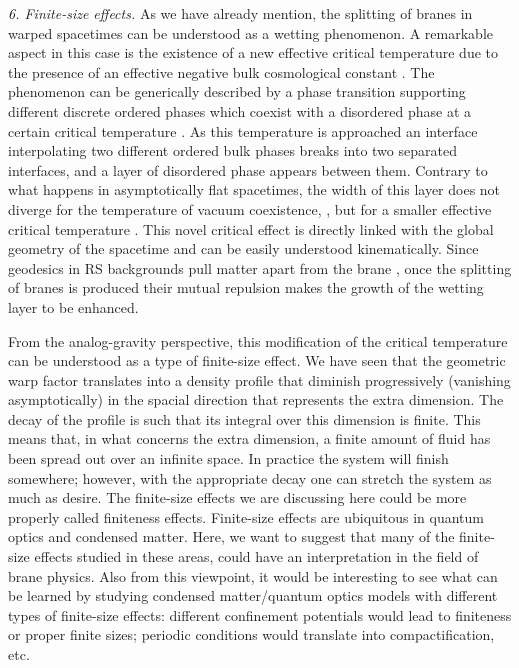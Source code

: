 \documentclass[a4paper,prl,showpacs,twocolumn]{revtex4}
\begin{document}
\noindent
{\it 6. Finite-size effects.}
As we have already mention, the splitting of branes in
warped spacetimes can be understood as a wetting 
phenomenon.
A remarkable aspect in this case is the existence of 
a new effective critical temperature due to the presence 
of an effective negative bulk cosmological constant 
\cite{Cam:2002}. 
The phenomenon can be generically described by a phase 
transition supporting different discrete ordered phases 
which coexist with a disordered phase at a certain 
critical temperature \coordHE{}. 
As this temperature is approached an interface interpolating 
two different ordered bulk phases breaks into two separated 
interfaces, and a layer of disordered phase appears between them.
Contrary to what happens in asymptotically flat spacetimes, 
the width of this layer does not diverge for the temperature of vacuum
coexistence, \coordHE{}, but for a smaller effective critical 
temperature \coordHE{}.
This novel critical effect is directly linked with the global
geometry of the spacetime and can be easily understood
kinematically.
Since geodesics in RS backgrounds pull matter apart
from the brane \cite{MucVisVol:2000},   
once the splitting of branes is produced their mutual
repulsion makes the growth of the wetting layer to be enhanced.


From the analog-gravity perspective, this modification of the critical
temperature can be understood as a type of finite-size effect.
We have seen that the geometric warp factor translates into a density
profile that diminish progressively (vanishing asymptotically)
in the spacial direction that represents the extra dimension.
The decay of the profile is such that its integral over this dimension 
is finite. This means that, in what concerns the extra dimension, a finite 
amount of fluid has been spread out over an infinite space.
In practice the system will finish somewhere; however, with the
appropriate decay one can stretch the system as much as desire.
The finite-size effects we are discussing here could be more properly
called finiteness effects.
Finite-size effects are ubiquitous in quantum optics and condensed matter. 
Here, we want to suggest that many of the finite-size effects studied
in these areas, could have an interpretation in the field of brane
physics. 
Also from this viewpoint, it would be interesting to see what
can be learned by studying condensed matter/quantum optics models
with different types of finite-size effects: different confinement 
potentials would lead to finiteness or proper finite sizes;  
periodic conditions would translate into compactification, etc.
 
\end{document}
